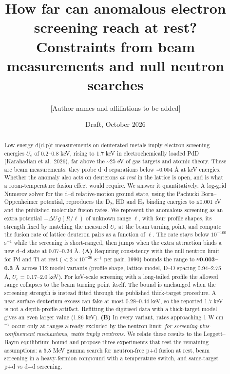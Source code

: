 \documentclass[
]{article}
\title{How far can anomalous electron screening reach at rest?
Constraints from beam measurements and null neutron searches}
\author{{[}Author names and affiliations to be added{]}}
\date{Draft, October 2026}
\begin{document}
\maketitle
\begin{abstract}
Low-energy d(d,p)t measurements on deuterated metals imply electron
screening energies \(U_e\) of 0.2--0.8 keV, rising to 1.7 keV in
electrochemically loaded PdD (Karahadian et al.~2026), far above the
\textasciitilde25 eV of gas targets and atomic theory. These are beam
measurements: they probe d--d separations below \textasciitilde0.004 Å
at keV energies. Whether the anomaly also acts on deuterons \emph{at
rest} in the lattice is open, and is what a room-temperature fusion
effect would require. We answer it quantitatively. A log-grid Numerov
solver for the d--d relative-motion ground state, using the Pachucki
Born--Oppenheimer potential, reproduces the D\(_2\), HD and H\(_2\)
binding energies to ≤0.001 eV and the published molecular fusion rates.
We represent the anomalous screening as an extra potential
\(-\Delta U\,g(R/\ell)\) of unknown range \(\ell\), with four profile
shapes, its strength fixed by matching the measured \(U_e\) at the beam
turning point, and compute the fusion rate of lattice deuteron pairs as
a function of \(\ell\). The rate stays below \(10^{-100}\) s\(^{-1}\)
while the screening is short-ranged, then jumps when the extra
attraction binds a new d--d state at 0.07--0.24 Å. \textbf{(A)}
Requiring consistency with the null neutron limit for Pd and Ti at rest
(\(<2\times10^{-26}\) s\(^{-1}\) per pair, 1990) bounds the range to
\textbf{≈0.003--0.3 Å} across 112 model variants (profile shape, lattice
model, D--D spacing 0.94--2.75 Å, \(U_e\) = 0.17--2.0 keV). For
keV-scale screening with a long-tailed profile the allowed range
collapses to the beam turning point itself. The bound is unchanged when
the screening strength is instead fitted through the published
thick-target procedure. A near-surface deuterium excess can fake at most
0.28--0.44 keV, so the reported 1.7 keV is not a depth-profile artifact.
Refitting the digitised data with a thick-target model gives an even
larger value (1.86 keV). \textbf{(B)} In every variant, rates
approaching 1 W cm\(^{-3}\) occur only at ranges already excluded by the
neutron limit: \emph{for screening-plus-confinement mechanisms, watts
imply neutrons.} We relate these results to the Leggett--Baym
equilibrium bound and propose three experiments that test the remaining
assumptions: a 5.5 MeV gamma search for neutron-free p+d fusion at rest,
beam screening in a heavy-fermion compound with a temperature switch,
and same-target p+d vs d+d screening.
\end{abstract}
\end{document}
